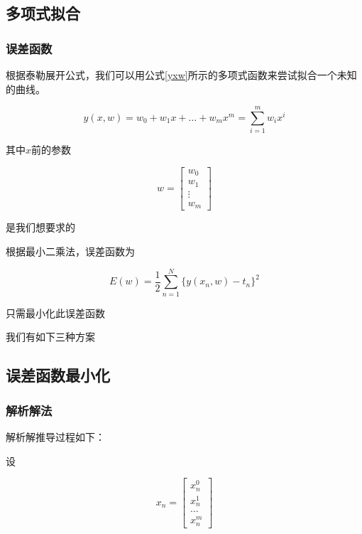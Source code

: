 \subsection{多项式拟合}

\subsubsection{误差函数}

根据泰勒展开公式，我们可以用公式\eqref{yxw}所示的多项式函数来尝试拟合一个未知的曲线。

\begin{equation}
    y(x, w) = w_0 + w_1 x + \ldots + w_m x^m = \sum_{i = 1}^{m} w_i x^i
    \label{yxw}
\end{equation}

其中$x$前的参数

\begin{equation}
    w = 
    \begin{bmatrix}
        w_0 \\ w_1 \\ \vdots \\ w_m
    \end{bmatrix}
\end{equation}

是我们想要求的

根据最小二乘法，误差函数为

\begin{equation}
    E(w) = \frac{1}{2} \sum_{n=1}^{N} \{ y(x_n, w) - t_n \}^2
    \label{loss}
\end{equation}

只需最小化此误差函数

我们有如下三种方案

\subsection{误差函数最小化}

\subsubsection{解析解法}

解析解推导过程如下：

设

\begin{equation}
    x_n =
    \begin{bmatrix}
        x_n^0 \\ x_n^1 \\ \ldots \\ x_n^m
    \end{bmatrix}
\end{equation}

